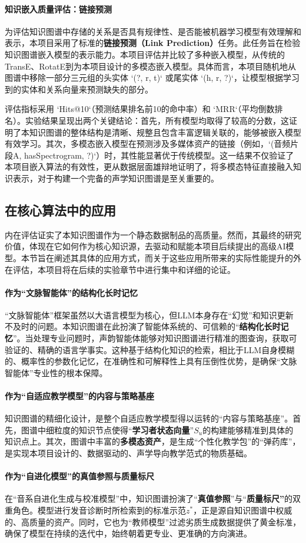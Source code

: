 \paragraph{知识嵌入质量评估：链接预测}
为评估知识图谱中存储的关系是否具有规律性、是否能被机器学习模型有效理解和表示，本项目采用了标准的\textbf{链接预测（Link Prediction）}任务。此任务旨在检验知识图谱嵌入模型的表示能力。本项目评估并比较了多种嵌入模型，从传统的TransE、RotatE到为本项目设计的多模态嵌入模型。具体而言，本项目随机地从图谱中移除一部分三元组的头实体 `(?, r, t)` 或尾实体 `(h, r, ?)`，让模型根据学习到的实体和关系向量来预测缺失的部分。

评估指标采用 `Hits@10`（预测结果排名前10的命中率）和 `MRR`（平均倒数排名）。实验结果呈现出两个关键结论：首先，所有模型均取得了较高的分数，这证明了本知识图谱的整体结构是清晰、规整且包含丰富逻辑关联的，能够被嵌入模型有效学习。其次，多模态嵌入模型在预测涉及多媒体资产的链接（例如，`(音频片段A, hasSpectrogram, ?)`）时，其性能显著优于传统模型。这一结果不仅验证了本项目嵌入算法的有效性，更从数据层面雄辩地证明了，将多模态特征直接融入知识表示，对于构建一个完备的声学知识图谱是至关重要的。

\subsection{在核心算法中的应用}
内在评估证实了本知识图谱作为一个静态数据制品的高质量。然而，其最终的研究价值，体现在它如何作为核心知识源，去驱动和赋能本项目后续提出的高级AI模型。本节旨在阐述其具体的应用方式，而关于这些应用所带来的实际性能提升的外在评估，本项目将在后续的实验章节中进行集中和详细的论证。

\paragraph{作为“文脉智能体”的结构化长时记忆}
“文脉智能体”框架虽然以大语言模型为核心，但LLM本身存在“幻觉”和知识更新不及时的问题。本知识图谱在此扮演了智能体系统的、可信赖的“\textbf{结构化长时记忆}”。当处理专业问题时，声韵智能体能够对知识图谱进行精准的图查询，获取可验证的、精确的语言学事实。这种基于结构化知识的检索，相比于LLM自身模糊的、概率性的参数化记忆，在准确性和可解释性上具有压倒性优势，是确保“文脉智能体”专业性的根本保障。

\paragraph{作为“自适应教学模型”的内容与策略基座}
知识图谱的精细化设计，是整个自适应教学模型得以运转的“内容与策略基座”。首先，图谱中细粒度的知识节点使得“\textbf{学习者状态向量}”$S_u$的构建能够精准到具体的知识点上。其次，图谱中丰富的\textbf{多模态资产}，是生成“个性化教学包”的“弹药库”，是实现本项目设计的、数据驱动的、声学导向教学范式的物质基础。

\paragraph{作为“自进化模型”的真值参照与质量标尺}
在“音系自进化生成与校准模型”中，知识图谱扮演了“\textbf{真值参照}”与“\textbf{质量标尺”}的双重角色。模型进行发音诊断时所检索到的标准示范$z^*$，正是源自知识图谱中权威的、高质量的资产。同时，它也为“教师模型”过滤劣质生成数据提供了黄金标准，确保了模型在持续的迭代中，始终朝着更专业、更准确的方向演进。

